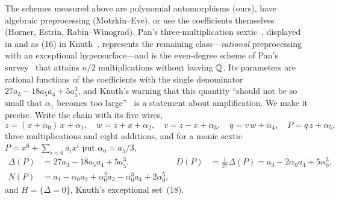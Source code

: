 The schemes measured above are polynomial automorphisms (ours), have algebraic
preprocessing (Motzkin--Eve), or use the coefficients themselves (Horner,
Estrin, Rabin--Winograd).  Pan's three-multiplication
sextic~\cite{pan1961schemes}, displayed in  and as (16) in
Knuth~\cite[\S4.6.4]{knuth1997seminumerical}, represents the remaining
class---\emph{rational} preprocessing with an exceptional hypersurface---and
is the even-degree scheme of Pan's survey~\cite{pan1966methods} that attains
$n/2$ multiplications without leaving $\mathbb{Q}$.  Its parameters are rational
functions of the coefficients with the single denominator
$27a_3-18a_5a_4+5a_5^3$, and Knuth's warning that this quantity ``should not
be so small that $\alpha_1$ becomes too large''~\cite[\S4.6.4,
after~(18)]{knuth1997seminumerical} is a statement about amplification.  We
make it precise.  Write the chain with its five wires,
\begin{equation}
\label{eq:pan-chain}
  z=(x+\alpha_0)\,x+\alpha_1,\quad w=z+x+\alpha_2,\quad v=z-x+\alpha_3,\quad
  q=v\,w+\alpha_4,\quad P=q\,z+\alpha_5 ,
\end{equation}
three multiplications and eight additions, and for a monic sextic
$P=x^6+\sum_{i<6}a_ix^i$ put $\alpha_0=a_5/3$,
\begin{equation}
\label{eq:pan-DN}
\begin{aligned}
  \Delta(P)&=27a_3-18a_5a_4+5a_5^3, &
  D(P)&=\tfrac{1}{27}\Delta(P)=a_3-2\alpha_0a_4+5\alpha_0^3,\\
  N(P)&=a_1-\alpha_0a_2+\alpha_0^2a_3-\alpha_0^3a_4+2\alpha_0^5,
\end{aligned}
\end{equation}
and $H=\{\Delta=0\}$, Knuth's exceptional set~(18).


